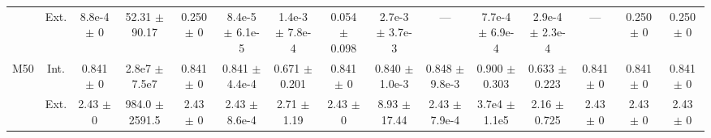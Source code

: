 \begin{table}[htbp]
{\begin{tabular}{@{}ccccccccccccccc@{}}
 & Ext. & 8.8e-4 $\pm$ 0 & 52.31 $\pm$ 90.17 & 0.250 $\pm$ 0 & 8.4e-5 $\pm$ 6.1e-5 & 1.4e-3 $\pm$ 7.8e-4 & 0.054 $\pm$ 0.098 & 2.7e-3 $\pm$ 3.7e-3 & --- & 7.7e-4 $\pm$ 6.9e-4 & 2.9e-4 $\pm$ 2.3e-4 & --- & 0.250 $\pm$ 0 & 0.250 $\pm$ 0 \\
\cline{2-15}
\multirow{2}{*}{M50} & Int. & 0.841 $\pm$ 0 & 2.8e7 $\pm$ 7.5e7 & 0.841 $\pm$ 0 & 0.841 $\pm$ 4.4e-4 & 0.671 $\pm$ 0.201 & 0.841 $\pm$ 0 & 0.840 $\pm$ 1.0e-3 & 0.848 $\pm$ 9.8e-3 & 0.900 $\pm$ 0.303 & 0.633 $\pm$ 0.223 & 0.841 $\pm$ 0 & 0.841 $\pm$ 0 & 0.841 $\pm$ 0 \\
 & Ext. & 2.43 $\pm$ 0 & 984.0 $\pm$ 2591.5 & 2.43 $\pm$ 0 & 2.43 $\pm$ 8.6e-4 & 2.71 $\pm$ 1.19 & 2.43 $\pm$ 0 & 8.93 $\pm$ 17.44 & 2.43 $\pm$ 7.9e-4 & 3.7e4 $\pm$ 1.1e5 & 2.16 $\pm$ 0.725 & 2.43 $\pm$ 0 & 2.43 $\pm$ 0 & 2.43 $\pm$ 0 \\
\bottomrule
\end{tabular}
}
\end{table}